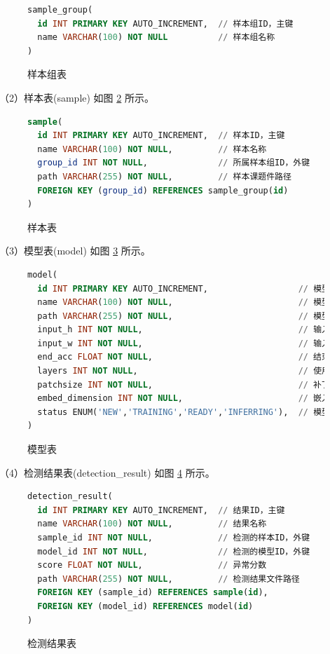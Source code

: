 \documentclass[
  ]{njuthesis}
\begin{document}
\begin{figure}[H]
    \begin{lstlisting}[language=sql]
sample_group(
  id INT PRIMARY KEY AUTO_INCREMENT,  // 样本组ID，主键
  name VARCHAR(100) NOT NULL          // 样本组名称
)
    \end{lstlisting}
    \caption{样本组表}
    \label{样本组表}
\end{figure}

（2）样本表(sample) 如图 \ref{样本表} 所示。

\begin{figure}[H]
    \begin{lstlisting}[language=sql]
sample(
  id INT PRIMARY KEY AUTO_INCREMENT,  // 样本ID，主键
  name VARCHAR(100) NOT NULL,         // 样本名称
  group_id INT NOT NULL,              // 所属样本组ID，外键
  path VARCHAR(255) NOT NULL,         // 样本课题件路径
  FOREIGN KEY (group_id) REFERENCES sample_group(id)
)
    \end{lstlisting}
    \caption{样本表}
    \label{样本表}
\end{figure}

（3）模型表(model) 如图 \ref{模型表} 所示。

\begin{figure}[H]
    \begin{lstlisting}[language=sql]
model(
  id INT PRIMARY KEY AUTO_INCREMENT,                  // 模型ID，主键
  name VARCHAR(100) NOT NULL,                         // 模型名称
  path VARCHAR(255) NOT NULL,                         // 模型文件路径
  input_h INT NOT NULL,                               // 输入高度  
  input_w INT NOT NULL,                               // 输入宽度
  end_acc FLOAT NOT NULL,                             // 结束精度
  layers INT NOT NULL,                                // 使用的层数
  patchsize INT NOT NULL,                             // 补丁大小
  embed_dimension INT NOT NULL,                       // 嵌入维度
  status ENUM('NEW','TRAINING','READY','INFERRING'),  // 模型状态
)
    \end{lstlisting}
    \caption{模型表}
    \label{模型表}
\end{figure}

（4）检测结果表(detection\_result) 如图 \ref{检测结果表} 所示。

\begin{figure}[H]
    \begin{lstlisting}[language=sql]
detection_result(
  id INT PRIMARY KEY AUTO_INCREMENT,  // 结果ID，主键
  name VARCHAR(100) NOT NULL,         // 结果名称
  sample_id INT NOT NULL,             // 检测的样本ID，外键
  model_id INT NOT NULL,              // 检测的模型ID，外键
  score FLOAT NOT NULL,               // 异常分数
  path VARCHAR(255) NOT NULL,         // 检测结果文件路径
  FOREIGN KEY (sample_id) REFERENCES sample(id),
  FOREIGN KEY (model_id) REFERENCES model(id)
)
    \end{lstlisting}
    \caption{检测结果表}
    \label{检测结果表}
\end{figure}
\end{document}
